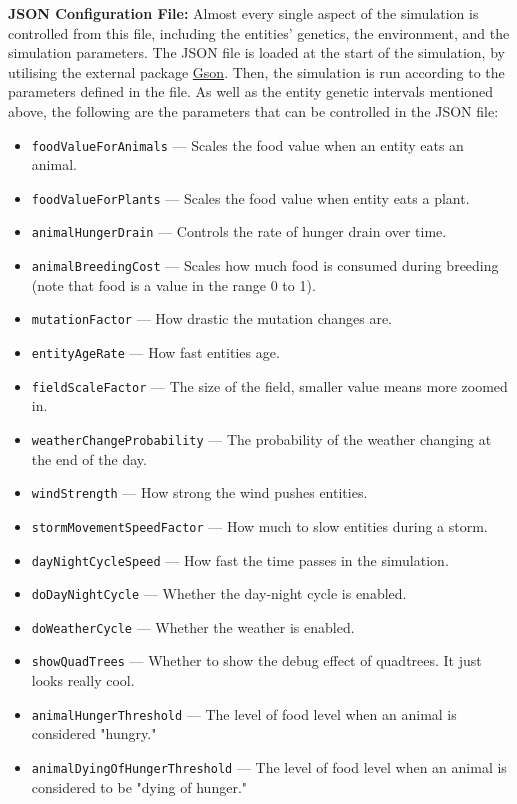 \documentclass[10pt, a4paper]{scrartcl}
\begin{document}
\begin{multicols}{2}
        \noindent \textbf{JSON Configuration File: } Almost every single aspect of the simulation is controlled from this file,
        including the entities' genetics, the environment, and the simulation parameters. The JSON file is loaded at the start
        of the simulation, by utilising the external package \href{https://github.com/google/gson/}{Gson}. Then, the simulation
        is run according to the parameters defined in the file. As well as the entity
        genetic intervals mentioned above, the following are the parameters that can be controlled in the JSON file:
        \begin{itemize}
            \setlength\itemsep{-0.25em}
            \item \verb|foodValueForAnimals| — Scales the food value when an entity eats an animal.
            \item \verb|foodValueForPlants| — Scales the food value when entity eats a plant.
            \item \verb|animalHungerDrain| — Controls the rate of hunger drain over time.
            \item \verb|animalBreedingCost| — Scales how much food is consumed during breeding (note that food is a value
            in the range 0 to 1).
            \item \verb|mutationFactor| — How drastic the mutation changes are.
            \item \verb|entityAgeRate| — How fast entities age.
            \item \verb|fieldScaleFactor| — The size of the field, smaller value means more zoomed in.
            \item \verb|weatherChangeProbability| — The probability of the weather changing at the end of the day.
            \item \verb|windStrength| — How strong the wind pushes entities.
            \item \verb|stormMovementSpeedFactor| — How much to slow entities during a storm.
            \item \verb|dayNightCycleSpeed| — How fast the time passes in the simulation.
            \item \verb|doDayNightCycle| — Whether the day-night cycle is enabled.
            \item \verb|doWeatherCycle| — Whether the weather is enabled.
            \item \verb|showQuadTrees| — Whether to show the debug effect of quadtrees. It just looks really cool.
            \item \verb|animalHungerThreshold| — The level of food level when an animal is considered "hungry."
            \item \verb|animalDyingOfHungerThreshold| — The level of food level when an animal is considered to be "dying of hunger."
        \end{itemize}


\end{multicols}
\end{document}
